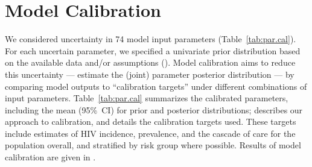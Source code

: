\section{Model Calibration}\label{mod.cal}
We considered uncertainty in 74 model input parameters (Table~\ref{tab:par.cal}).
For each uncertain parameter, we specified a univariate prior distribution
based on the available data and/or assumptions ().
Model calibration aims to reduce this uncertainty
--- \ie estimate the (joint) parameter posterior distribution ---
by comparing model outputs to ``calibration targets''
under different combinations of input parameters.
Table~\ref{tab:par.cal} summarizes the calibrated parameters,
including the mean (95\%~CI) for prior and posterior distributions;
 describes our approach to calibration, and
 details the calibration targets used.
These targets include estimates of HIV incidence, prevalence, and the cascade of care
for the population overall, and stratified by risk group where possible.
Results of model calibration are given in .



